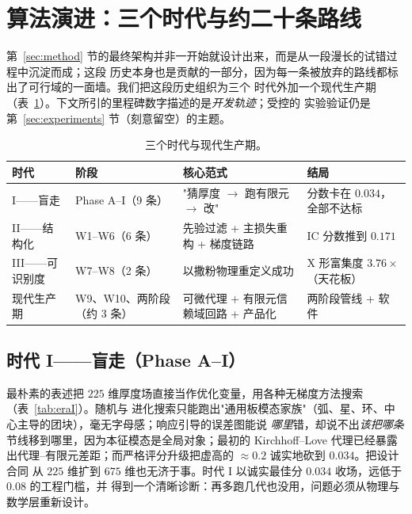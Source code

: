 \documentclass[11pt,a4paper]{article}
\begin{document}
\section{算法演进：三个时代与约二十条路线}\label{sec:eras}

第~\ref{sec:method} 节的最终架构并非一开始就设计出来，而是从一段漫长的试错过程中沉淀而成；这段
历史本身也是贡献的一部分，因为每一条被放弃的路线都标出了可行域的一面墙。我们把这段历史组织为三个
时代外加一个现代生产期（表~\ref{tab:eras}）。下文所引的里程碑数字描述的是\emph{开发轨迹}；受控的
实验验证仍是第~\ref{sec:experiments} 节（刻意留空）的主题。

\begin{table}[h]
\centering
\caption{三个时代与现代生产期。}
\label{tab:eras}
\small
\begin{tabular}{@{}p{2.6cm}p{2.9cm}p{5.0cm}p{3.6cm}@{}}
\toprule
时代 & 阶段 & 核心范式 & 结局 \\
\midrule
I------盲走 & Phase A--I（9 条） & "猜厚度 $\to$ 跑有限元 $\to$ 改" & 分数卡在 $0.034$，全部不达标 \\
II------结构化 & W1--W6（6 条） & 先验过滤 + 主损失重构 + 梯度链路 & IC 分数推到 $0.171$ \\
III------可识别度 & W7--W8（2 条） & 以撒粉物理重定义成功 & X 形富集度 $3.76\times$（天花板） \\
现代生产期 & W9、W10、两阶段（约 3 条） & 可微代理 + 有限元信赖域回路 + 产品化 & 两阶段管线 + 软件 \\
\bottomrule
\end{tabular}
\end{table}

\subsection{时代 I------盲走（Phase A--I）}\label{sec:eraI}
最朴素的表述把 $225$ 维厚度场直接当作优化变量，用各种无梯度方法搜索（表~\ref{tab:eraI}）。随机与
进化搜索只能跑出"通用板模态家族"（弧、星、环、中心主导的团块），毫无字母感；响应引导的误差图能说
\emph{哪里}错，却说不出\emph{该把哪条}节线移到哪里，因为本征模态是全局对象；最初的 Kirchhoff--Love
代理已经暴露出代理--有限元差距；而严格评分升级把虚高的 $\approx0.2$ 诚实地砍到 $0.034$。把设计合同
从 $225$ 维扩到 $675$ 维也无济于事。时代 I 以诚实最佳分 $0.034$ 收场，远低于 $0.08$ 的工程门槛，并
得到一个清晰诊断：再多跑几代也没用，问题必须从物理与数学层重新设计。
\end{document}

